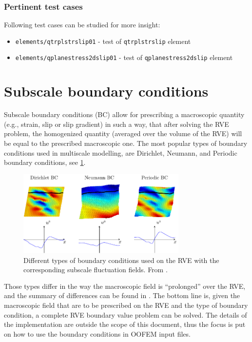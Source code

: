 \documentclass[11pt]{article}
\begin{document}
\subsubsection{Pertinent test cases}
Following test cases can be studied for more insight: 
\begin{itemize}
    \item \texttt{elements/qtrplstrslip01} - test of \texttt{qtrplstrslip} element
    \item \texttt{elements/qplanestress2dslip01} - test of \texttt{qplanestress2dslip} element
\end{itemize}


\clearpage
\section{Subscale boundary conditions}
\label{sec:bc}

Subscale boundary conditions (BC) allow for prescribing a macroscopic quantity (e.g., strain, slip or slip gradient) in such a way, that after solving the RVE problem, the homogenized quantity (averaged over the volume of the RVE) will be equal to the prescribed macroscopic one. 
The most popular types of boundary conditions used in multiscale modelling, are Dirichlet, Neumann, and Periodic boundary conditions, see \cref{fig:bc_types}. 

\begin{figure}[H]
    \centering
    \includegraphics[width=0.75\textwidth]{img/subscaleBC.pdf}
    \caption{Different types of boundary conditions used on the RVE with the corresponding subscale fluctuation fields. From \cite{Sciegaj2020phd}.}
    \label{fig:bc_types}
\end{figure}

Those types differ in the way the macroscopic field is ``prolonged'' over the RVE, and the summary of differences can be found in \cite{Sciegaj2020phd}.
The bottom line is, given the macroscopic field that are to be prescribed on the RVE and the type of boundary condition, a complete RVE boundary value problem can be solved. 
The details of the implementation are outside the scope of this document, thus the focus is put on how to use the boundary conditions in OOFEM input files.
\end{document}
